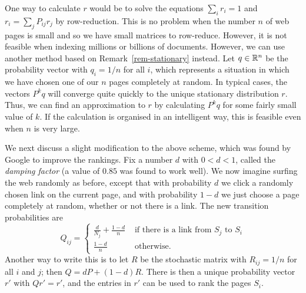 \documentclass[reqno]{amsart}
\theoremstyle{definition}
\newcommand{\dfn}[1]{\emph{{#1}}\index{#1}}
\begin{document}
One way to calculate $r$ would be to solve the equations $\sum_ir_i=1$
and $r_i=\sum_jP_{ij}r_j$ by row-reduction.  This is no problem when
the number $n$ of web pages is small and so we have small matrices to
row-reduce.  However, it is not feasible when indexing millions or
billions of documents.  However, we can use another method based on
Remark~\ref{rem-stationary} instead.  Let $q\in{\mathbb{R}}^n$ be the
probability vector with $q_i=1/n$ for all $i$, which represents a
situation in which we have chosen one of our $n$ pages completely at
random.  In typical cases, the vectors $P^kq$ will converge quite
quickly to the unique stationary distribution $r$.  Thus, we can find
an approximation to $r$ by calculating $P^kq$ for some fairly small
value of $k$.  If the calculation is organised in an intelligent way,
this is feasible even when $n$ is very large.

We next discuss a slight modification to the above scheme, which was
found by Google to improve the rankings.  Fix a number $d$ with
$0<d<1$, called the \dfn{damping factor} (a value of $0.85$ was found
to work well).  We now imagine surfing the web randomly as before,
except that with probability $d$ we click a randomly chosen link on
the current page, and with probability $1-d$ we just choose a page
completely at random, whether or not there is a link.  The new
transition probabilities are
\[ Q_{ij} = \begin{cases}
     \frac{d}{N_j} + \frac{1-d}{n} &
         \text{ if there is a link from $S_j$ to $S_i$} \\
     \frac{1-d}{n} & \text{ otherwise. } 
   \end{cases}
\]
Another way to write this is to let $R$ be the stochastic matrix with
$R_{ij}=1/n$ for all $i$ and $j$; then $Q=dP+(1-d)R$.  There is then
a unique probability vector $r'$ with $Qr'=r'$, and the entries in
$r'$ can be used to rank the pages $S_i$.
\end{document}
